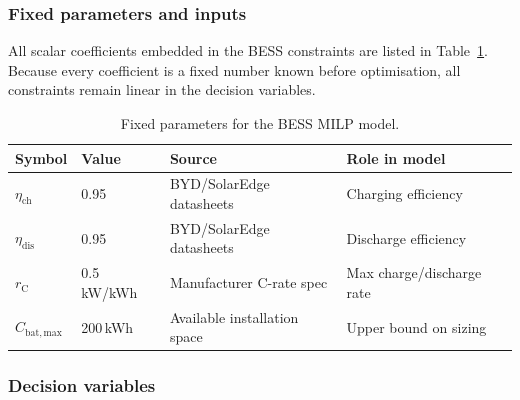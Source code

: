 \documentclass[11pt,a4paper]{report}
\begin{document}
\subsubsection{Fixed parameters and inputs}
\label{sub:bess_params}

All scalar coefficients embedded in the BESS constraints are listed in
Table~\ref{tab:bess_inputs}.
Because every coefficient is a fixed number known before optimisation, all
constraints remain linear in the decision variables.

\begin{table}[H]
\centering
\caption{Fixed parameters for the BESS MILP model.}
\label{tab:bess_inputs}
\begin{tabular}{lllp{4.8cm}}
\hline
\textbf{Symbol} & \textbf{Value} & \textbf{Source} & \textbf{Role in model} \\
\hline
$\eta_\mathrm{ch}$ & 0.95 & BYD/SolarEdge datasheets & Charging efficiency \\
$\eta_\mathrm{dis}$ & 0.95 & BYD/SolarEdge datasheets & Discharge efficiency \\
$r_\mathrm{C}$ & 0.5\,kW/kWh & Manufacturer C-rate spec & Max charge/discharge rate \\
$C_\mathrm{bat,max}$ & 200\,kWh & Available installation space & Upper bound on sizing \\
\hline
\end{tabular}
\end{table}

\subsubsection{Decision variables}
\label{sub:bess_vars}
\end{document}
